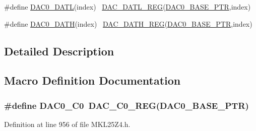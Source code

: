 \begin{DoxyCompactItemize}
\item 
\#define \hyperlink{group___d_a_c___register___accessor___macros_gad1e226ca5378cccb3032a3e65ee3aabd}{D\+A\+C0\+\_\+\+D\+A\+TL}(index)                                              ~\hyperlink{group___d_a_c___register___accessor___macros_gabf321758d2caebaf297aed5907b1bb5d}{D\+A\+C\+\_\+\+D\+A\+T\+L\+\_\+\+R\+EG}(\hyperlink{group___d_a_c___peripheral_gabe3b30df06ec04e5c899efd6e49f1800}{D\+A\+C0\+\_\+\+B\+A\+S\+E\+\_\+\+P\+TR},index)
\item 
\#define \hyperlink{group___d_a_c___register___accessor___macros_gab4d4a155e15a18015eddcab55644a588}{D\+A\+C0\+\_\+\+D\+A\+TH}(index)                                              ~\hyperlink{group___d_a_c___register___accessor___macros_ga2993d3474a391b72469826f58317edc9}{D\+A\+C\+\_\+\+D\+A\+T\+H\+\_\+\+R\+EG}(\hyperlink{group___d_a_c___peripheral_gabe3b30df06ec04e5c899efd6e49f1800}{D\+A\+C0\+\_\+\+B\+A\+S\+E\+\_\+\+P\+TR},index)
\end{DoxyCompactItemize}


\subsection{Detailed Description}


\subsection{Macro Definition Documentation}
\subsubsection[{\texorpdfstring{D\+A\+C0\+\_\+\+C0}{DAC0_C0}}]{\setlength{\rightskip}{0pt plus 5cm}\#define D\+A\+C0\+\_\+\+C0~{\bf D\+A\+C\+\_\+\+C0\+\_\+\+R\+EG}({\bf D\+A\+C0\+\_\+\+B\+A\+S\+E\+\_\+\+P\+TR})}\hypertarget{group___d_a_c___register___accessor___macros_ga00e22b8e72b6f59cbb7c46c47c71930c}{}\label{group___d_a_c___register___accessor___macros_ga00e22b8e72b6f59cbb7c46c47c71930c}


Definition at line 956 of file M\+K\+L25\+Z4.\+h.

